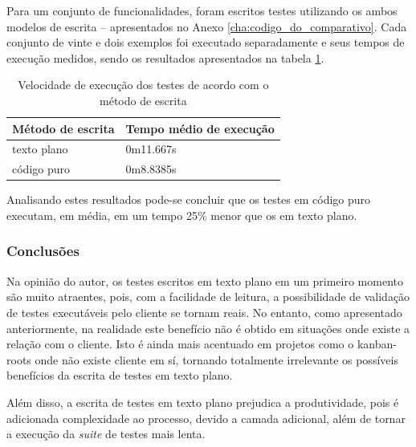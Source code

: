 Para um conjunto de funcionalidades, foram escritos testes utilizando os ambos modelos de escrita – apresentados no Anexo \ref{cha:codigo_do_comparativo}. Cada conjunto de vinte e dois exemplos foi executado separadamente e seus tempos de execução medidos, sendo os resultados apresentados na tabela \ref{table:tempo_de_execucao}.

\begin{table}[ht]
\caption{Velocidade de execução dos testes de acordo com o método de escrita}
\label{table:tempo_de_execucao}
\centering
\begin{tabular}{p{4.5cm} p{6.5cm}}
\toprule
\textbf{Método de escrita} & \textbf{Tempo médio de execução} \\
\midrule[1pt]
texto plano & 0m11.667s \\ \midrule
código puro & 0m8.8385s \\
\bottomrule
\end{tabular}
\end{table}

Analisando estes resultados pode-se concluir que os testes em código puro executam, em média, em um tempo 25\% menor que os em texto plano.


\subsubsection{Conclusões} %
\label{subsub:conclusoes_bdd}

Na opinião do autor, os testes escritos em texto plano em um primeiro momento são muito atraentes, pois, com a facilidade de leitura, a possibilidade de validação de testes executáveis pelo cliente se tornam reais. No entanto, como apresentado anteriormente, na realidade este benefício não é obtido em situações onde existe a relação com o cliente. Isto é ainda mais acentuado em projetos como o kanban-roots onde não existe cliente em sí, tornando totalmente irrelevante os possíveis benefícios da escrita de testes em texto plano.

 Além disso, a escrita de testes em texto plano prejudica a produtividade, pois é adicionada complexidade ao processo, devido a camada adicional, além de tornar a execução da \textit{suite} de testes mais lenta.




